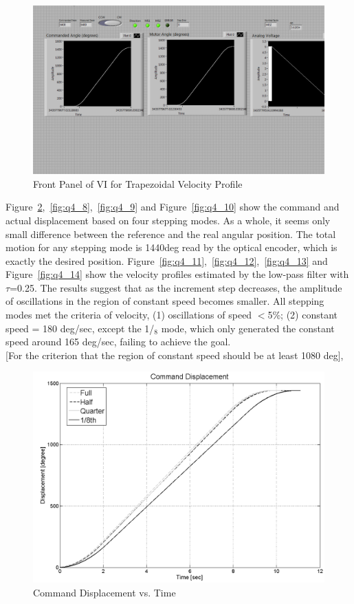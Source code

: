 \documentclass{article}
\theoremstyle{plain}
\theoremstyle{definition}
\theoremstyle{remark}
\begin{document}
\begin{figure}[h!]
\includegraphics[width=1\textwidth]{Q4_FrontPanel_VI.png}
\caption{Front Panel of VI for Trapezoidal Velocity Profile} \label{tex}
\label{fig:q4_6}
\end{figure}

Figure~\ref{fig:q4_7},~\ref{fig:q4_8},~\ref{fig:q4_9} and Figure~\ref{fig:q4_10} show the command and actual displacement based on four stepping modes. As a whole, it seems only small difference between the reference and the real angular position. The total motion for any stepping mode is 1440deg read by the optical encoder, which is exactly the desired position. Figure~\ref{fig:q4_11},~\ref{fig:q4_12},~\ref{fig:q4_13} and Figure~\ref{fig:q4_14} show the velocity profiles estimated by the low-pass filter with $\tau$=0.25. The results suggest that as the increment step decreases, the amplitude of oscillations in the region of constant speed becomes smaller. All stepping modes met the criteria of velocity, (1) oscillations of speed $<$5\%; (2) constant speed = 180 deg/sec, except the 1/${_8}$ mode, which only generated the constant speed around 165 deg/sec, failing to achieve the goal. \\

[For the criterion that the region of constant speed should be at least 1080 deg], 

\begin{figure}[h]
\includegraphics[width=1\textwidth]{Q4_CommandPosition.png}
\caption{Command Displacement vs. Time} \label{tex}
\label{fig:q4_7}
\end{figure}
\end{document}
